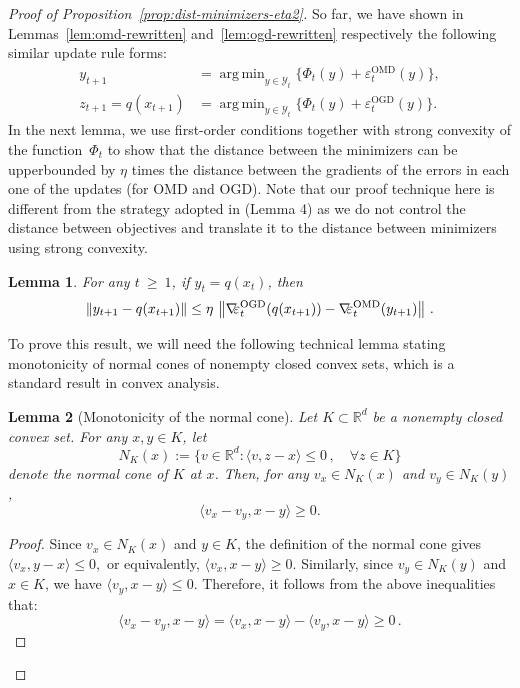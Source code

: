 \documentclass[a4paper,11pt,fullpage]{article}
\def\Y{{\mathcal Y}}
\theoremstyle{plain}
\newtheorem{lemma}{Lemma}
\theoremstyle{definition}
\theoremstyle{plain}
\DeclareMathOperator*{\argmin}{arg\,min}
\renewcommand{\geq}{~\ge~}
\let\nablaold\nabla
\renewcommand{\nabla}{\nablaold\mkern-2.5mu}
\begin{document}
\begin{proof}[Proof of Proposition~\ref{prop:dist-minimizers-eta2}]
So far, we have shown in Lemmas~\ref{lem:omd-rewritten} and~\ref{lem:ogd-rewritten} respectively the following similar update rule forms: 
\begin{align}
y_{t+1}
&=
\argmin_{y\in \Y_t}\{\Phi_t(y)+\varepsilon_t^{\mathrm{OMD}}(y)\},
\label{eq:min1}
\\
z_{t+1} = q(x_{t+1})
&=
\argmin_{y\in \Y_t}\{\Phi_t(y)+\varepsilon_t^{\mathrm{OGD}}(y)\}.
\label{eq:min2}
\end{align}
In the next lemma, we use first-order conditions together with strong convexity of the function~$\Phi_t$ to show that the distance between the minimizers can be upperbounded by $\eta$ times the distance between the gradients of the errors in each one of the updates (for OMD and OGD). Note that our proof technique here is different from the strategy adopted in \citet{ghai-lu-hazan22} (Lemma 4) as we do not control the distance between objectives and translate it to the distance between minimizers using strong convexity. 

\begin{tcolorbox}[colframe=white!, top=2pt,left=2pt,right=2pt,bottom=2pt] 
\begin{lemma} 
\label{lem:dist-minimizers-eta-times-norm}
For any $t \geq 1$, if $y_t = q(x_t)$, then 
\begin{equation*}
\|y_{t+1} - q(x_{t+1})\| \le \eta\,
\left\|\nabla\varepsilon_t^{\mathrm{OGD}}(q(x_{t+1})) - \nabla\varepsilon_t^{\mathrm{OMD}}(y_{t+1})\right\|\,.
\end{equation*}
\end{lemma}
\end{tcolorbox}

To prove this result, we will need the following technical lemma stating monotonicity of normal cones of nonempty closed convex sets, which is a standard result in convex analysis. 

\begin{lemma}[Monotonicity of the normal cone]
\label{lem:normal-cone-monotonicity}
Let \(K\subset \mathbb R^d\) be a nonempty closed convex set. For any
\(x,y\in K\), let
\[
N_K(x):=\{v\in\mathbb R^d:\langle v,z-x\rangle\le 0
\,, \quad \forall z\in K\}
\]
denote the normal cone of \(K\) at \(x\). Then, for any
\(v_x\in N_K(x)\) and \(v_y\in N_K(y)\),
\[
\langle v_x-v_y,x-y\rangle \ge 0.
\]
\end{lemma}

\begin{proof}
Since \(v_x\in N_K(x)\) and \(y\in K\), the definition of the normal cone gives $\langle v_x,y-x\rangle\le 0,$
or equivalently, $\langle v_x,x-y\rangle\ge 0.$
Similarly, since \(v_y\in N_K(y)\) and \(x\in K\), we have 
$\langle v_y,x-y\rangle\le 0.$
Therefore, it follows from the above inequalities that: 
\begin{equation*}
\langle v_x-v_y,x-y\rangle
=
\langle v_x,x-y\rangle
-
\langle v_y,x-y\rangle
\ge 0\,.
\end{equation*}
\end{proof}


\end{proof}
\end{document}
